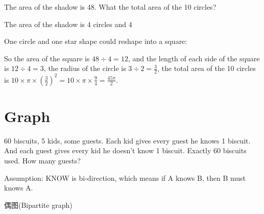 \begin{example}
  The area of the shadow is 48. What the total area of the 10 circles?
  \begin{center}
  \end{center}
\end{example}

The area of the shadow is 4 circles  and 4 

One circle and one star shape could reshape into a square:
\begin{center}
\end{center}

So the area of the square is $48\div4=12$, and the length of each side of the square is $12\div 4=3$, the radius of the circle is $3\div2=\frac32$, the total area of the 10 circles is $10\times \pi\times\left(\frac32\right)^2=10\times\pi\times\frac94=\frac{45\pi}{2}$.


\chapter{Graph}
\label{ch:graph}

\begin{example}
  60 biscuits, 5 kids, some guests. Each kid gives every guest he knows 1 biscuit. And each guest gives every kid he doesn't know 1 biscuit. Exactly 60 biscuits used. How many guests?  
\end{example}

Assumption: KNOW is bi-direction, which means if A knows B, then B must knows A.

偶图(Bipartite graph)


